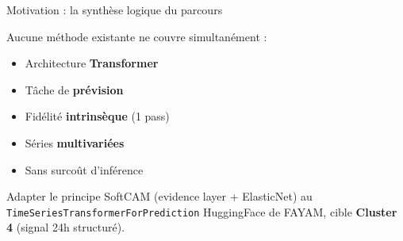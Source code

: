 \documentclass[10pt]{beamer}
\begin{document}
\begin{frame}{Motivation : la synthèse logique du parcours}
  \begin{tcolorbox}[colback=newcontrib!5, colframe=newcontrib!70!black, arc=3mm,
                    fonttitle=\bfseries, title=Ce que les méthodes précédentes ne couvrent pas]
    Aucune méthode existante ne couvre simultanément :
    \begin{itemize}
      \item[\checkmark] Architecture \textbf{Transformer}
      \item[\checkmark] Tâche de \textbf{prévision}
      \item[\checkmark] Fidélité \textbf{intrinsèque} (1 pass)
      \item[\checkmark] Séries \textbf{multivariées}
      \item[\checkmark] Sans surcoût d'inférence
    \end{itemize}
  \end{tcolorbox}

  \begin{tcolorbox}[colback=blue!3, colframe=blue!50!black, arc=2mm,
                    fonttitle=\bfseries, title=Notre proposition : SoftCAM-Transformer]
    \centering
    Adapter le principe SoftCAM (evidence layer + ElasticNet) au\\
    \texttt{TimeSeriesTransformerForPrediction} HuggingFace de FAYAM,
    cible \textbf{Cluster 4} (signal 24h structuré).
  \end{tcolorbox}
\end{frame}
\end{document}

